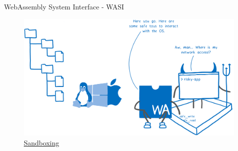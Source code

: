 \documentclass{beamer}
\begin{document}
\begin{frame}{WebAssembly System Interface - WASI}
    \begin{figure}
        \includegraphics[scale=0.07]{./images/sandbox.png}
        \caption{\href{https://hacks.mozilla.org/2019/03/standardizing-wasi-a-webassembly-system-interface/}{Sandboxing}}
    \end{figure}
\end{frame}
\end{document}
